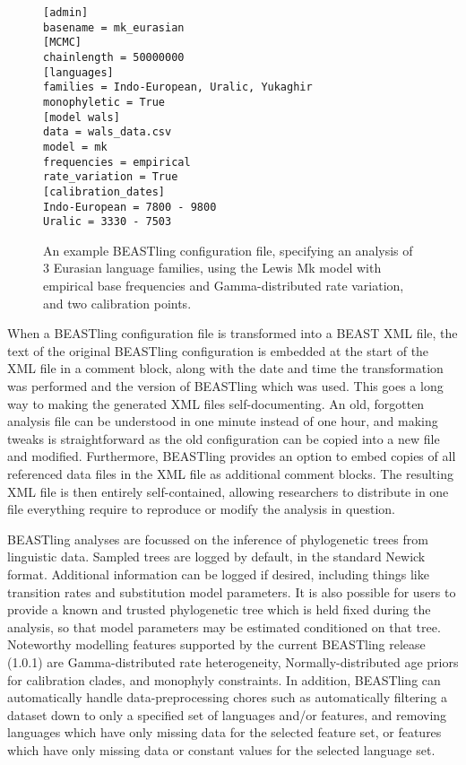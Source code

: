 \documentclass[twocolumn,10pt]{scrartcl}
\begin{document}
\begin{figure}[t]
	\begin{verbatim}[admin]
basename = mk_eurasian
[MCMC]
chainlength = 50000000
[languages]
families = Indo-European, Uralic, Yukaghir
monophyletic = True
[model wals]
data = wals_data.csv
model = mk
frequencies = empirical
rate_variation = True
[calibration_dates]
Indo-European = 7800 - 9800
Uralic = 3330 - 7503\end{verbatim}
	\caption{An example BEASTling configuration file, specifying an analysis of 3 Eurasian language families, using the Lewis Mk model with empirical base frequencies and Gamma-distributed rate variation, and two calibration points.}
\label{fig:config}
\end{figure}

When a BEASTling configuration file is transformed into a BEAST XML file, the text of the original BEASTling configuration is embedded at the start of the XML file in a comment block, along with the date and time the transformation was performed and the version of BEASTling which was used.  This goes a long way to making the generated XML files self-documenting.  An old, forgotten analysis file can be understood in one minute instead of one hour, and making tweaks is straightforward as the old configuration can be copied into a new file and modified.  Furthermore, BEASTling provides an option to embed copies of all referenced data files in the XML file as additional comment blocks.  The resulting XML file is then entirely self-contained, allowing researchers to distribute in one file everything require to reproduce or modify the analysis in question.

BEASTling analyses are focussed on the inference of phylogenetic trees from linguistic data.  Sampled trees are logged by default, in the standard Newick format.  Additional information can be logged if desired, including things like transition rates and substitution model parameters.  It is also possible for users to provide a known and trusted phylogenetic tree which is held fixed during the analysis, so that model parameters may be estimated conditioned on that tree.  Noteworthy modelling features supported by the current BEASTling release (1.0.1) are Gamma-distributed rate heterogeneity, Normally-distributed age priors for calibration clades, and monophyly constraints.  In addition, BEASTling can automatically handle data-preprocessing chores such as automatically filtering a dataset down to only a specified set of languages and/or features, and removing languages which have only missing data for the selected feature set, or features which have only missing data or constant values for the selected language set.
\end{document}
